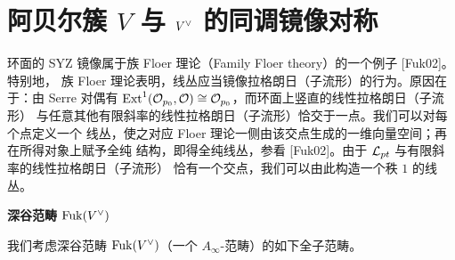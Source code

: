\section{阿贝尔簇 $V$ 与 $V^{\vee}$ 的同调镜像对称}

环面的 SYZ 镜像属于族 Floer 理论（Family Floer theory）的一个例子 [Fuk02]。特别地，
族 Floer 理论表明，线丛应当镜像拉格朗日（子流形）的行为。原因在于：由 Serre 对偶有
$\mathrm{Ext}^1(\mathcal{O}_{p_0},\mathcal{O})\cong\mathcal{O}_{p_0}$，而环面上竖直的线性拉格朗日（子流形）
与任意其他有限斜率的线性拉格朗日（子流形）恰交于一点。我们可以对每个点定义一个
线丛，使之对应 Floer 理论一侧由该交点生成的一维向量空间；再在所得对象上赋予全纯
结构，即得全纯线丛，参看 [Fuk02]。由于 $\mathcal{L}_{pt}$ 与有限斜率的线性拉格朗日（子流形）
恰有一个交点，我们可以由此构造一个秩 $1$ 的线丛。


\medskip\noindent\textbf{深谷范畴 $\mathrm{Fuk}(V^{\vee})$}\par

我们考虑深谷范畴 $\mathrm{Fuk}(V^{\vee})$（一个 $A_\infty$-范畴）的如下全子范畴。

